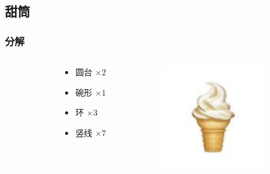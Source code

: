 \documentclass[aspectratio=169]{ctexbeamer} %
\begin{document}
\subsection{甜筒}
\begin{frame}
    \frametitle{分解} %
    \begin{columns}
    \begin{column}{.1\textwidth}\end{column}
        \begin{column}{.4\textwidth}
            \begin{itemize}
                \item 圆台 $\times 2$
                \item 碗形 $\times 1$
                \item 环 $\times 3$
                \item 竖线 $\times 7$
            \end{itemize}
        \end{column}
        \begin{column}{.5\textwidth}
            \includegraphics[width=128pt]{images/pre/emoji.pdf}
        \end{column}
    \end{columns}
\end{frame}
\end{document}
